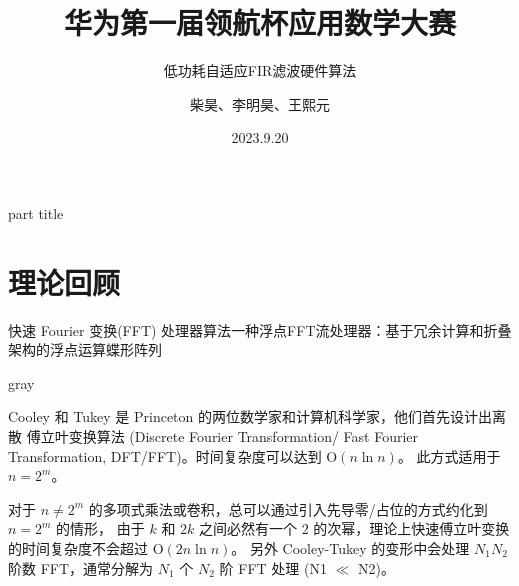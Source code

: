 \documentclass[8pt]{ctexbeamer}
\title{华为第一届领航杯应用数学大赛}
\subtitle{低功耗自适应FIR滤波硬件算法}
\date{2023.9.20}
\author{柴昊、李明昊、王熙元}
\institute{复旦大学\\
	南京大学}
\renewenvironment{quote}
{
	\begin{notebox}{gray}
}
{
	\end{notebox}
}
\begin{document}
\begin{frame}
	\titlepage
\end{frame}

\begin{frame}[plain]
	\begin{beamercolorbox}[sep=12pt,center]{part title}
		{\Large	\contentsname}		
	\end{beamercolorbox}
    \tableofcontents
\end{frame}

\section{理论回顾}


\begin{frame}{快速 Fourier 变换(FFT) 处理器算法}{一种浮点FFT流处理器：基于冗余计算和折叠架构的浮点运算蝶形阵列}
	\begin{quote}
		Cooley 和 Tukey 是 Princeton 的两位数学家和计算机科学家，他们首先设计出离散
		傅立叶变换算法 (Discrete Fourier Transformation/ Fast Fourier Transformation, 
		DFT/FFT)。时间复杂度可以达到 $\mathrm{O}(n \ln n)$。
		此方式适用于 $n = 2^m$。
		
		对于 $n \not= 2^m$ 的多项式乘法或卷积，总可以通过引入先导零/占位的方式约化到 $n = 2^m$ 的情形，
		由于 $k$
		和 $2k$ 之间必然有一个 $2$ 的次幂，理论上快速傅立叶变换的时间复杂度不会超过 $\mathrm{O}(2n \ln n)$。
		另外 Cooley-Tukey
		的变形中会处理 $N_1 N_2$ 阶数 FFT，通常分解为 $N_1$ 个 $N_2$ 阶 FFT 处理 (N1 $\ll$ N2)。
	\end{quote}



\end{frame}
\end{document}
